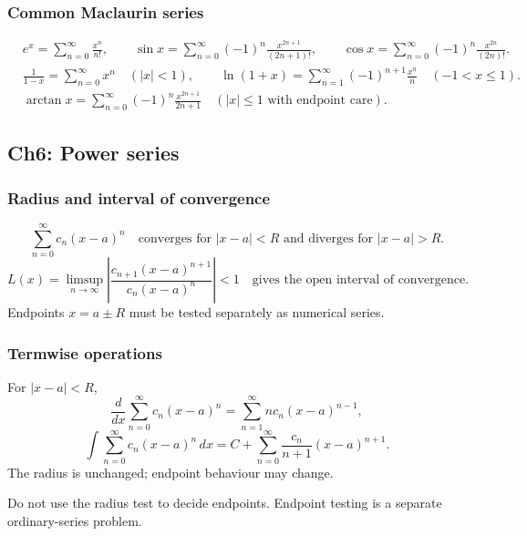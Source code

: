 \subsubsection{Common Maclaurin series}
\begin{keyformula}[title={High-Frequency Maclaurin Series}]
\begin{align*}
&e^x=\sum_{n=0}^{\infty}\frac{x^n}{n!},
\qquad
\sin x=\sum_{n=0}^{\infty}(-1)^n\frac{x^{2n+1}}{(2n+1)!},
\qquad
\cos x=\sum_{n=0}^{\infty}(-1)^n\frac{x^{2n}}{(2n)!}.\\
&\frac{1}{1-x}=\sum_{n=0}^{\infty}x^n\quad(|x|<1),
\qquad
\ln(1+x)=\sum_{n=1}^{\infty}(-1)^{n+1}\frac{x^n}{n}\quad(-1<x\le1).\\
&\arctan x=\sum_{n=0}^{\infty}(-1)^n\frac{x^{2n+1}}{2n+1}
\quad(|x|\le1\text{ with endpoint care}).
\end{align*}
\end{keyformula}

\subsection{Ch6: Power series}

\subsubsection{Radius and interval of convergence}
\begin{keyformula}[title={Power Series Radius and Endpoint Workflow}]
\[
\sum_{n=0}^{\infty}c_n(x-a)^n
\quad\text{converges for }|x-a|<R\text{ and diverges for }|x-a|>R.
\]
\[
L(x)=\limsup_{n\to\infty}\left|\frac{c_{n+1}(x-a)^{n+1}}{c_n(x-a)^n}\right|<1
\quad\text{gives the open interval of convergence.}
\]
Endpoints \(x=a\pm R\) must be tested separately as numerical series.
\end{keyformula}

\subsubsection{Termwise operations}
\begin{keyformula}[title={Term-by-Term Differentiation and Integration}]
For \(|x-a|<R\),
\[
\frac{d}{dx}\sum_{n=0}^{\infty}c_n(x-a)^n
=\sum_{n=1}^{\infty}n c_n(x-a)^{n-1},
\]
\[
\int\sum_{n=0}^{\infty}c_n(x-a)^n\,dx
=C+\sum_{n=0}^{\infty}\frac{c_n}{n+1}(x-a)^{n+1}.
\]
The radius is unchanged; endpoint behaviour may change.
\end{keyformula}

\begin{commonmistake}
Do not use the radius test to decide endpoints.  Endpoint testing is a separate
ordinary-series problem.
\end{commonmistake}
